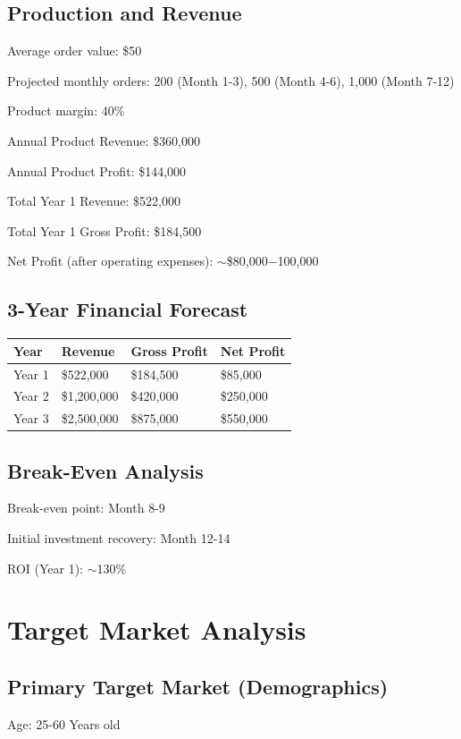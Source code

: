 \documentclass[11pt,a4paper]{article}
\begin{document}
\subsection{Production and Revenue}
Average order value: \$50 

Projected monthly orders: 200 (Month 1-3), 500 (Month 4-6), 1,000 (Month 7-12) 

Product margin: 40\% 

Annual Product Revenue: \$360,000 

Annual Product Profit: \$144,000 

Total Year 1 Revenue: \$522,000 

Total Year 1 Gross Profit: \$184,500 

Net Profit (after operating expenses): $\sim$\$80,000$-$100,000 

\subsection{3-Year Financial Forecast}
\begin{table}[h]
\centering
\begin{tabularx}{\textwidth}{lXXX}
\toprule
Year & Revenue & Gross Profit & Net Profit \\
\midrule
Year 1 & \$522,000 & \$184,500 & \$85,000 \\
Year 2 & \$1,200,000 & \$420,000 & \$250,000 \\
Year 3 & \$2,500,000 & \$875,000 & \$550,000 \\
\bottomrule
\end{tabularx}
\end{table}

\subsection{Break-Even Analysis}
Break-even point: Month 8-9 

Initial investment recovery: Month 12-14 

ROI (Year 1): $\sim$130\% 

\section{Target Market Analysis}
\subsection{Primary Target Market (Demographics)}

Age: 25-60 Years old 
\end{document}
